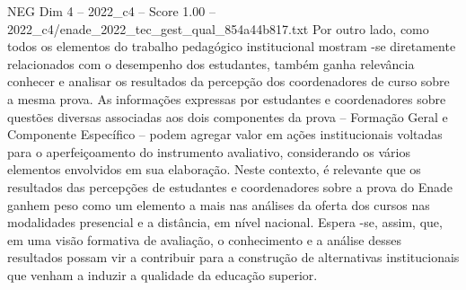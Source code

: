 \begin{textsample}{NEG Dim 4 – 2022\_c4 – Score 1.00 – 2022\_c4/enade\_2022\_tec\_gest\_qual\_854a44b817.txt}
Por outro lado, como todos os elementos do trabalho pedagógico institucional mostram -se diretamente relacionados com o desempenho dos estudantes, também ganha relevância conhecer e analisar os resultados da percepção dos coordenadores de curso sobre a mesma prova.
As informações expressas por estudantes e coordenadores sobre questões diversas associadas aos dois componentes da prova – Formação Geral e Componente Específico – podem agregar valor em ações institucionais voltadas para o aperfeiçoamento do instrumento avaliativo, considerando os vários elementos envolvidos em sua elaboração.
Neste contexto, é relevante que os resultados das percepções de estudantes e coordenadores sobre a prova do Enade ganhem peso como um elemento a mais nas análises da oferta dos cursos nas modalidades presencial e a distância, em nível nacional.
Espera -se, assim, que, em uma visão formativa de avaliação, o conhecimento e a análise desses resultados possam vir a contribuir para a construção de alternativas institucionais que venham a induzir a qualidade da educação superior.

\end{textsample}
